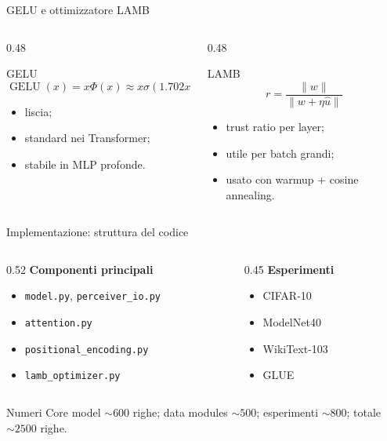 \documentclass[aspectratio=169,10pt]{beamer}
\begin{document}
\begin{frame}{GELU e ottimizzatore LAMB}
\small
\begin{columns}[T]
\begin{column}{0.48\textwidth}
\begin{block}{GELU}
\[
\operatorname{GELU}(x)=x\Phi(x)\approx x\sigma(1.702x)
\]
\begin{itemize}
  \item liscia;
  \item standard nei Transformer;
  \item stabile in MLP profonde.
\end{itemize}
\end{block}
\end{column}
\begin{column}{0.48\textwidth}
\begin{block}{LAMB}
\[
r=\frac{\lVert w\rVert}{\lVert w+\eta \hat u\rVert}
\]
\begin{itemize}
  \item trust ratio per layer;
  \item utile per batch grandi;
  \item usato con warmup + cosine annealing.
\end{itemize}
\end{block}
\end{column}
\end{columns}
\end{frame}

\begin{frame}{Implementazione: struttura del codice}
\small
\begin{columns}[T]
\begin{column}{0.52\textwidth}
\textbf{Componenti principali}
\begin{itemize}
  \item \texttt{model.py}, \texttt{perceiver\_io.py}
  \item \texttt{attention.py}
  \item \texttt{positional\_encoding.py}
  \item \texttt{lamb\_optimizer.py}
\end{itemize}
\end{column}
\begin{column}{0.45\textwidth}
\textbf{Esperimenti}
\begin{itemize}
  \item CIFAR-10
  \item ModelNet40
  \item WikiText-103
  \item GLUE
\end{itemize}
\end{column}
\end{columns}

\begin{exampleblock}{Numeri}
Core model $\sim600$ righe; data modules $\sim500$; esperimenti $\sim800$; totale $\sim2500$ righe.
\end{exampleblock}
\end{frame}
\end{document}
